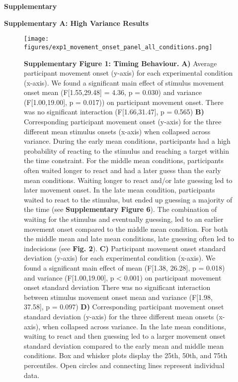 \documentclass[12pt]{article}
\newcommand\boldblue[1]{\textcolor{mydarkblue}{\textbf{#1}}}
\newcommand{\SectionHeader}[1]{\noindent\textbf{\Large\textcolor{mydarkblue}{#1}}\normalsize }
\begin{document}
\SectionHeader{Supplementary}

\noindent\boldblue{\large{Supplementary A: High Variance Results}}
\begin{figure}[H]
    \centering
    \texttt{[image: figures/exp1\_movement\_onset\_panel\_all\_conditions.png]}
    \caption*{\boldblue{Supplementary Figure 1: Timing Behaviour.} \boldblue{A)} Average participant movement onset (y-axis) for each experimental condition (x-axis). We found a significant main effect of stimulus movement onset mean (F[1.55,29.48] = 4.36, p = 0.030) and variance (F[1.00,19.00], p = 0.017)) on participant movement onset. There was no significant interaction (F[1.66,31.47], p = 0.565) \boldblue{B)} Corresponding participant movement onset (y-axis) for the three different mean stimulus onsets (x-axis) when collapsed across variance. During the early mean conditions, participants had a high probability of reacting to the stimulus and reaching a target within the time constraint. For the middle mean conditions, participants often waited longer to react and had a later guess than the early mean conditions. Waiting longer to react and/or late guessing led to later movement onset. In the late mean condition, participants waited to react to the stimulus, but ended up guessing a majority of the time (see \boldblue{Supplementary Figure 6}). The combination of waiting for the stimulus and eventually guessing, led to an earlier movement onset compared to the middle mean condition. For both the middle mean and late mean conditions, late guessing often led to indecisions (see \boldblue{Fig. 2}). \boldblue{C)} Participant movement onset standard deviation (y-axis) for each experimental condition (x-axis). We found a significant main effect of mean (F[1.38, 26.28], p = 0.018) and variance (F[1.00,19.00], p < 0.001) on participant movement onset standard deviation There was no significant interaction between stimulus movement onset mean and variance (F[1.98, 37.58], p = 0.097) \boldblue{D)} Corresponding participant movement onset standard deviation (y-axis) for the three different mean onsets (x-axis), when collapsed across variance. In the late mean conditions, waiting to react and then guessing led to a larger movement onset standard deviation compared to the early mean and middle mean conditions. Box and whisker plots display the 25th, 50th, and 75th percentiles. Open circles and connecting lines represent individual data.}
\end{figure}
\end{document}
